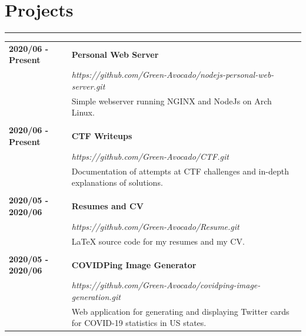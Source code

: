 \documentclass[letterpaper]{article}
\newcommand{\horizontalLine}{%
    \rule{\textwidth}{0.2pt}
    \vspace{1ex}
}
\begin{document}
    \section*{Projects}

        \horizontalLine

        \begin{tabular}{p{} p{}} 
            \textbf{2020/06 - Present} & \large\textbf{Personal Web Server} \\
            & \emph{https://github.com/Green-Avocado/nodejs-personal-web-server.git} \\
            & Simple webserver running NGINX and NodeJs on Arch Linux. \\
            \\
            \textbf{2020/06 - Present} & \large\textbf{CTF Writeups} \\
            & \emph{https://github.com/Green-Avocado/CTF.git} \\
            & Documentation of attempts at CTF challenges and in-depth explanations of solutions. \\
            \\
            \textbf{2020/05 - 2020/06} & \large\textbf{Resumes and CV} \\
            & \emph{https://github.com/Green-Avocado/Resume.git} \\
            & LaTeX source code for my resumes and my CV. \\
            \\
            \textbf{2020/05 - 2020/06} & \large\textbf{COVIDPing Image Generator} \\
            & \emph{https://github.com/Green-Avocado/covidping-image-generation.git} \\
            & Web application for generating and displaying Twitter cards for COVID-19 statistics in US states. \\
        \end{tabular}
\end{document}
